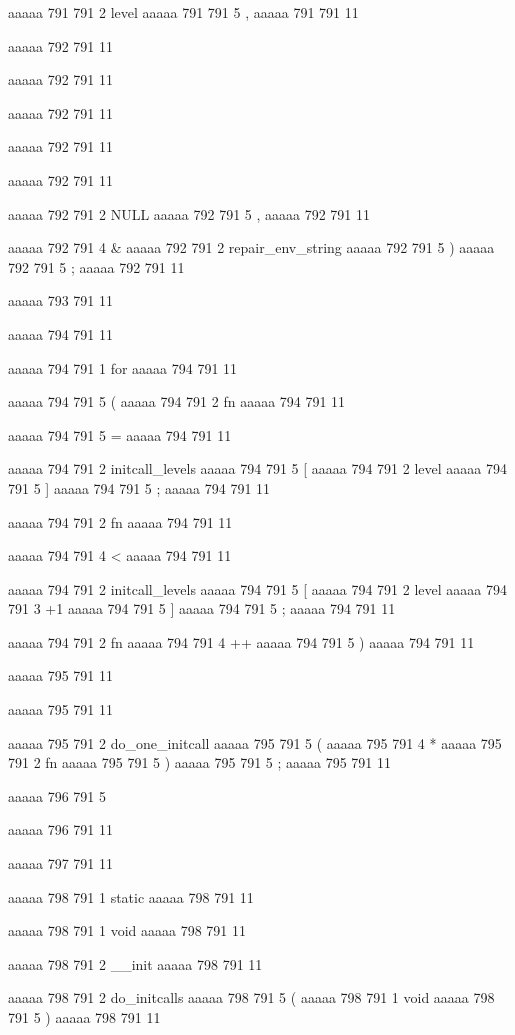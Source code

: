 {aaaaa 791 791
2
level
aaaaa 791 791
5
,
aaaaa 791 791
11


aaaaa 792 791
11
	
aaaaa 792 791
11
	
aaaaa 792 791
11
 
aaaaa 792 791
11
 
aaaaa 792 791
11
 
aaaaa 792 791
2
NULL
aaaaa 792 791
5
,
aaaaa 792 791
11
 
aaaaa 792 791
4
&
aaaaa 792 791
2
repair_env_string
aaaaa 792 791
5
)
aaaaa 792 791
5
;
aaaaa 792 791
11


aaaaa 793 791
11


aaaaa 794 791
11
	
aaaaa 794 791
1
for
aaaaa 794 791
11
 
aaaaa 794 791
5
(
aaaaa 794 791
2
fn
aaaaa 794 791
11
 
aaaaa 794 791
5
=
aaaaa 794 791
11
 
aaaaa 794 791
2
initcall_levels
aaaaa 794 791
5
[
aaaaa 794 791
2
level
aaaaa 794 791
5
]
aaaaa 794 791
5
;
aaaaa 794 791
11
 
aaaaa 794 791
2
fn
aaaaa 794 791
11
 
aaaaa 794 791
4
<
aaaaa 794 791
11
 
aaaaa 794 791
2
initcall_levels
aaaaa 794 791
5
[
aaaaa 794 791
2
level
aaaaa 794 791
3
+1
aaaaa 794 791
5
]
aaaaa 794 791
5
;
aaaaa 794 791
11
 
aaaaa 794 791
2
fn
aaaaa 794 791
4
++
aaaaa 794 791
5
)
aaaaa 794 791
11


aaaaa 795 791
11
	
aaaaa 795 791
11
	
aaaaa 795 791
2
do_one_initcall
aaaaa 795 791
5
(
aaaaa 795 791
4
*
aaaaa 795 791
2
fn
aaaaa 795 791
5
)
aaaaa 795 791
5
;
aaaaa 795 791
11


aaaaa 796 791
5
}
aaaaa 796 791
11


aaaaa 797 791
11


aaaaa 798 791
1
static
aaaaa 798 791
11
 
aaaaa 798 791
1
void
aaaaa 798 791
11
 
aaaaa 798 791
2
__init
aaaaa 798 791
11
 
aaaaa 798 791
2
do_initcalls
aaaaa 798 791
5
(
aaaaa 798 791
1
void
aaaaa 798 791
5
)
aaaaa 798 791
11


